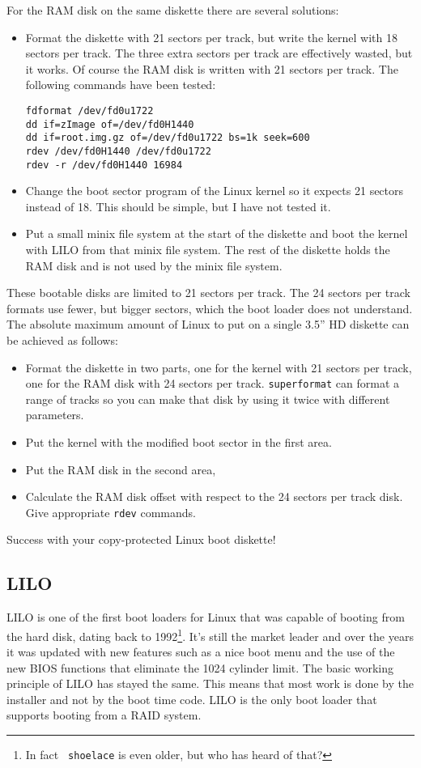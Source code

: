 \documentclass[12pt,a4paper]{article}
\begin{document}
For the RAM disk on the same diskette there are several solutions:
\begin{itemize}
\item Format the diskette with 21 sectors per track, but write the
  kernel with 18 sectors per track. The three extra sectors per track
  are effectively wasted, but it works. Of course the RAM disk is
  written with 21 sectors per track. The following commands have been tested:
\begin{verbatim}
fdformat /dev/fd0u1722
dd if=zImage of=/dev/fd0H1440
dd if=root.img.gz of=/dev/fd0u1722 bs=1k seek=600
rdev /dev/fd0H1440 /dev/fd0u1722
rdev -r /dev/fd0H1440 16984
\end{verbatim}
\item Change the boot sector program of the Linux kernel so it expects
  21 sectors instead of 18. This should be simple, but I have not
  tested it.
\item Put a small minix file system at the start of the diskette and
  boot the kernel with LILO from that minix file system. The rest of
  the diskette holds the RAM disk and is not used by the minix file system.
\end{itemize}
These bootable disks are limited to 21 sectors per track. The 24
sectors per track formats use fewer, but bigger sectors, which the
boot loader does not understand. The absolute maximum amount of Linux
to put on a single 3.5'' HD diskette can be achieved as follows:
\begin{itemize}
\item Format the diskette in two parts, one for the kernel with 21
  sectors per track, one for the RAM disk with 24 sectors per
  track. {\tt superformat} can format a range of tracks so you can
  make that disk by using it twice with different parameters.
\item Put the kernel with the modified boot sector in the first area.
\item Put the RAM disk in the second area,
\item Calculate the RAM disk offset with respect to the 24 sectors per
  track disk. Give appropriate {\tt rdev} commands.
\end{itemize}
Success with your copy-protected Linux boot diskette!

\subsection{LILO}

LILO is one of the first boot loaders for Linux that was capable of
booting from the hard disk, dating back to 1992\footnote{In fact {\tt
shoelace} is even older, but who has heard of that?}. It's still the
market leader and over the years it was updated with new features such
as a nice boot menu and the use of the new BIOS functions that
eliminate the 1024 cylinder limit. The basic working principle of
LILO has stayed the same. This means that most work is done by
the installer and not by the boot time code. LILO is the only boot
loader that supports booting from a RAID system.
\end{document}
